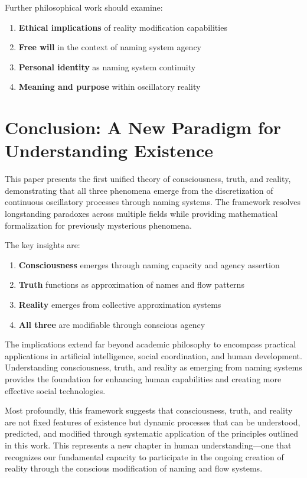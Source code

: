 \documentclass[12pt]{article}
\begin{document}
Further philosophical work should examine:

\begin{enumerate}
\item \textbf{Ethical implications} of reality modification capabilities
\item \textbf{Free will} in the context of naming system agency
\item \textbf{Personal identity} as naming system continuity
\item \textbf{Meaning and purpose} within oscillatory reality
\end{enumerate}

\section{Conclusion: A New Paradigm for Understanding Existence}

This paper presents the first unified theory of consciousness, truth, and reality, demonstrating that all three phenomena emerge from the discretization of continuous oscillatory processes through naming systems. The framework resolves longstanding paradoxes across multiple fields while providing mathematical formalization for previously mysterious phenomena.

The key insights are:

\begin{enumerate}
\item \textbf{Consciousness} emerges through naming capacity and agency assertion
\item \textbf{Truth} functions as approximation of names and flow patterns
\item \textbf{Reality} emerges from collective approximation systems
\item \textbf{All three} are modifiable through conscious agency
\end{enumerate}

The implications extend far beyond academic philosophy to encompass practical applications in artificial intelligence, social coordination, and human development. Understanding consciousness, truth, and reality as emerging from naming systems provides the foundation for enhancing human capabilities and creating more effective social technologies.

Most profoundly, this framework suggests that consciousness, truth, and reality are not fixed features of existence but dynamic processes that can be understood, predicted, and modified through systematic application of the principles outlined in this work. This represents a new chapter in human understanding—one that recognizes our fundamental capacity to participate in the ongoing creation of reality through the conscious modification of naming and flow systems.
\end{document}

